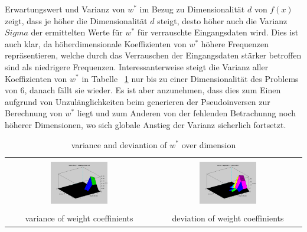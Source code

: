 \documentclass[]{report}
\begin{document}
Erwartungswert und Varianz von $w^*$ im Bezug zu Dimensionalität $d$ von $f(x)$ zeigt, dass je h\"oher die Dimensionalität $d$ steigt, desto h\"oher auch die Varianz $Sigma$ der ermittelten Werte f\"ur $w^*$ f\"ur verrauschte Eingangsdaten wird. Dies ist auch klar, da höherdimensionale Koeffizienten von $w^*$ h\"ohere Frequenzen repr\"asentieren, welche durch das Verrauschen der Eingangsdaten st\"arker betroffen sind als niedrigere Frequenzen.
Interessanterweise steigt die Varianz aller Koeffizienten von $w^*$ in Tabelle ~\ref{tab:VarianceAndDeviantion} nur bis zu einer Dimensionalit\"at des Problems von 6, danach f\"allt sie wieder. Es ist aber anzunehmen, dass dies zum Einen aufgrund von Unzul\"anglichkeiten beim generieren der Pseudoinversen zur Berechnung von $w^*$ liegt und zum Anderen von der fehlenden Betrachunng noch h\"oherer Dimensionen, wo sich globale Anstieg der Varianz sicherlich fortsetzt.

\begin{table}[h]
\begin{tabular}{| c | c |}
\hline
 & \\
\includegraphics[width=0.4\textwidth]{./images/VarianceWeightCoeffinientsOverDimension.png} & \includegraphics[width=0.4\textwidth]{./images/DeviationWeightCoeffinientsOverDimension.png} \\
 & \\
variance of weight coeffinients & deviation of weight coeffinients \\
\hline
\end{tabular}
\caption{variance and deviantion of $w^*$ over dimension}
\label{tab:VarianceAndDeviantion}
\end{table}
\end{document}
